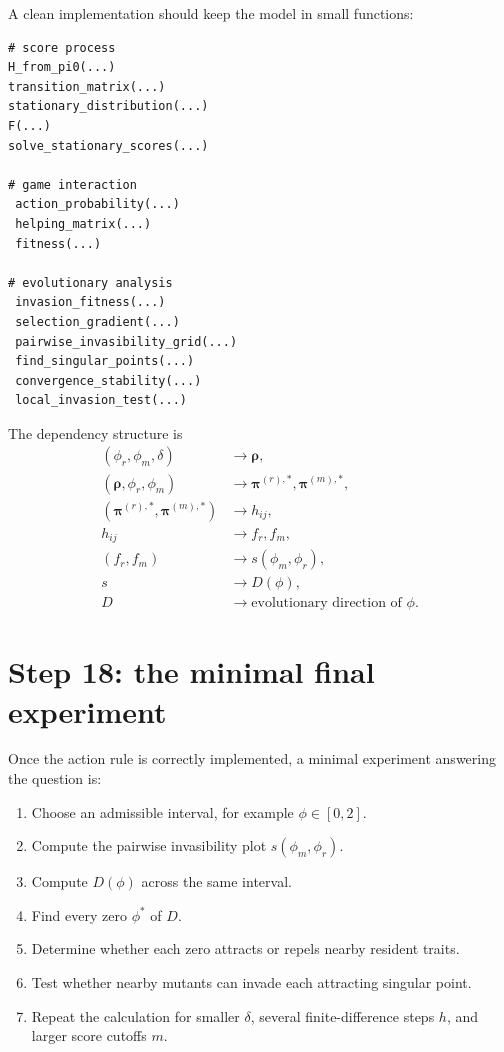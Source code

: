 \documentclass[11pt]{article}
\begin{document}
A clean implementation should keep the model in small functions:

\begin{lstlisting}
# score process
H_from_pi0(...)
transition_matrix(...)
stationary_distribution(...)
F(...)
solve_stationary_scores(...)

# game interaction
 action_probability(...)
 helping_matrix(...)
 fitness(...)

# evolutionary analysis
 invasion_fitness(...)
 selection_gradient(...)
 pairwise_invasibility_grid(...)
 find_singular_points(...)
 convergence_stability(...)
 local_invasion_test(...)
\end{lstlisting}

The dependency structure is
\[
\boxed{
\begin{aligned}
(\phi_r,\phi_m,\delta)
&\longrightarrow \bm{\rho},\\
(\bm{\rho},\phi_r,\phi_m)
&\longrightarrow \bm{\pi}^{(r),*},\bm{\pi}^{(m),*},\\
(\bm{\pi}^{(r),*},\bm{\pi}^{(m),*})
&\longrightarrow h_{ij},\\
h_{ij}
&\longrightarrow f_r,f_m,\\
(f_r,f_m)
&\longrightarrow s(\phi_m,\phi_r),\\
s
&\longrightarrow D(\phi),\\
D
&\longrightarrow \text{evolutionary direction of }\phi.
\end{aligned}
}
\]

\section{Step 18: the minimal final experiment}

Once the action rule is correctly implemented, a minimal experiment answering the question is:

\begin{enumerate}[label=\arabic*.]
\item Choose an admissible interval, for example $\phi\in[0,2]$.
\item Compute the pairwise invasibility plot $s(\phi_m,\phi_r)$.
\item Compute $D(\phi)$ across the same interval.
\item Find every zero $\phi^*$ of $D$.
\item Determine whether each zero attracts or repels nearby resident traits.
\item Test whether nearby mutants can invade each attracting singular point.
\item Repeat the calculation for smaller $\delta$, several finite-difference steps $h$, and larger score cutoffs $m$.
\end{enumerate}
\end{document}
